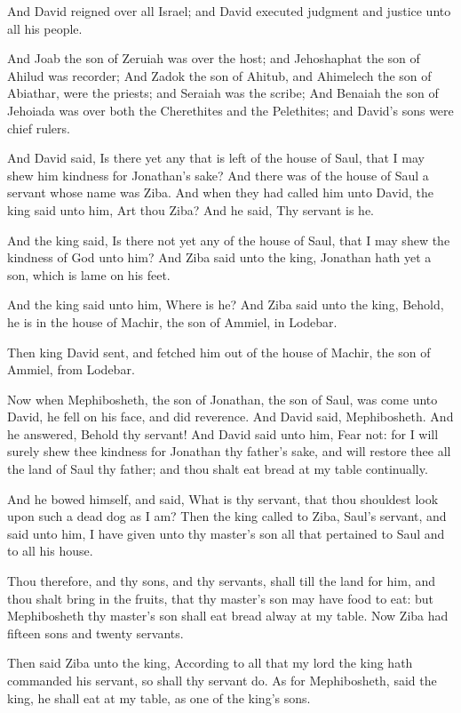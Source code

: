 \Verse And David reigned over all Israel; and David executed judgment and justice unto all his people.

\Verse And Joab the son of Zeruiah was over the host; and Jehoshaphat the son of Ahilud was recorder; \Verse And Zadok the son of Ahitub, and Ahimelech the son of Abiathar, were the priests; and Seraiah was the scribe; \Verse And Benaiah the son of Jehoiada was over both the Cherethites and the Pelethites; and David's sons were chief rulers.


\Chapter
\Verse And David said, Is there yet any that is left of the house of Saul, that I may shew him kindness for Jonathan's sake?  \Verse And there was of the house of Saul a servant whose name was Ziba. And when they had called him unto David, the king said unto him, Art thou Ziba?  And he said, Thy servant is he.

\Verse And the king said, Is there not yet any of the house of Saul, that I may shew the kindness of God unto him? And Ziba said unto the king, Jonathan hath yet a son, which is lame on his feet.

\Verse And the king said unto him, Where is he? And Ziba said unto the king, Behold, he is in the house of Machir, the son of Ammiel, in Lodebar.

\Verse Then king David sent, and fetched him out of the house of Machir, the son of Ammiel, from Lodebar.

\Verse Now when Mephibosheth, the son of Jonathan, the son of Saul, was come unto David, he fell on his face, and did reverence. And David said, Mephibosheth. And he answered, Behold thy servant!  \Verse And David said unto him, Fear not: for I will surely shew thee kindness for Jonathan thy father's sake, and will restore thee all the land of Saul thy father; and thou shalt eat bread at my table continually.

\Verse And he bowed himself, and said, What is thy servant, that thou shouldest look upon such a dead dog as I am?  \Verse Then the king called to Ziba, Saul's servant, and said unto him, I have given unto thy master's son all that pertained to Saul and to all his house.

\Verse Thou therefore, and thy sons, and thy servants, shall till the land for him, and thou shalt bring in the fruits, that thy master's son may have food to eat: but Mephibosheth thy master's son shall eat bread alway at my table. Now Ziba had fifteen sons and twenty servants.

\Verse Then said Ziba unto the king, According to all that my lord the king hath commanded his servant, so shall thy servant do. As for Mephibosheth, said the king, he shall eat at my table, as one of the king's sons.

